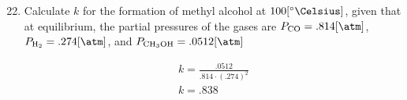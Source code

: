 \documentclass[12pt]{article}
\begin{document}
\begin{enumerate}
    \setcounter{enumi}{21}

  \item Calculate $k$ for the formation of methyl alcohol at $100[\si{\degree\Celsius}]$, given that at equilibrium, the partial pressures of the gases are $P_{\ce{CO}}=.814[\si{\atm}]$, $P_{\ce{H2}}=.274[\si{\atm}]$, and $P_{\ce{CH3OH}}=.0512[\si{\atm}]$

    \begin{center}
    \end{center}

    \begin{equation}
      \begin{split}
        k=\frac{.0512}{.814\cdot(.274)^2}\\
        k=.838
      \end{split}
      \label{8}
    \end{equation}

\end{enumerate}
\end{document}
